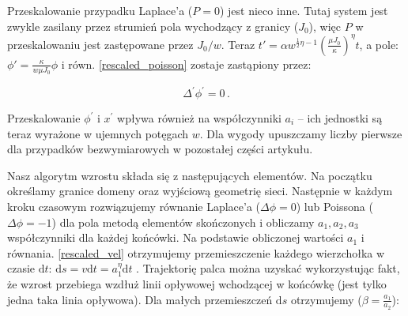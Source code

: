 \documentclass[]{pracamgr}
\begin{document}
      Przeskalowanie przypadku Laplace'a ($P=0$) jest nieco inne. Tutaj system jest zwykle zasilany przez strumień pola wychodzący z granicy ($J_0$), więc $P$ w przeskalowaniu jest zastępowane przez $J_0 / w$. Teraz $t' = \alpha w^{\frac{1}{2}\eta-1} (\frac{\mu J_0}{\kappa})^{\eta} t$, a pole: $ \phi' = \frac{\kappa}{w \mu J_0}\phi$ i równ. \eqref{rescaled_poisson} zostaje zastąpiony przez:
      
      \begin{equation}
        \Delta^\prime \phi^\prime = 0 \,.
      \end{equation}

      Przeskalowanie $\phi^\prime$ i $x^\prime$ wpływa również na współczynniki $a_i$ -- ich jednostki są teraz wyrażone w ujemnych potęgach $w$. Dla wygody upuszczamy liczby pierwsze dla przypadków bezwymiarowych w pozostałej części artykułu.

      Nasz algorytm wzrostu składa się z następujących elementów. Na początku określamy granice domeny oraz wyjściową geometrię sieci. Następnie w każdym kroku czasowym rozwiązujemy równanie Laplace'a ($\Delta \phi = 0$) lub Poissona ($\Delta \phi = -1$) dla pola metodą elementów skończonych i obliczamy $a_1 , a_2, a_3$ współczynniki dla każdej końcówki. Na podstawie obliczonej wartości $a_1$ i równania. \eqref{rescaled_vel} otrzymujemy przemieszczenie każdego wierzchołka w czasie $\textrm{d}t$: $\textrm{d}s = v \textrm{d}t = a_1^\eta \textrm{d}t$ . Trajektorię palca można uzyskać wykorzystując fakt, że wzrost przebiega wzdłuż linii opływowej wchodzącej w końcówkę (jest tylko jedna taka linia opływowa). Dla małych przemieszczeń $\textrm{d}s$ otrzymujemy ($\beta = \frac{a_1}{a_2}$):
\end{document}
